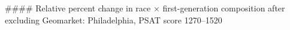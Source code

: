 #### Relative percent change in race × first-generation composition after excluding Geomarket: Philadelphia, PSAT score 1270–1520
